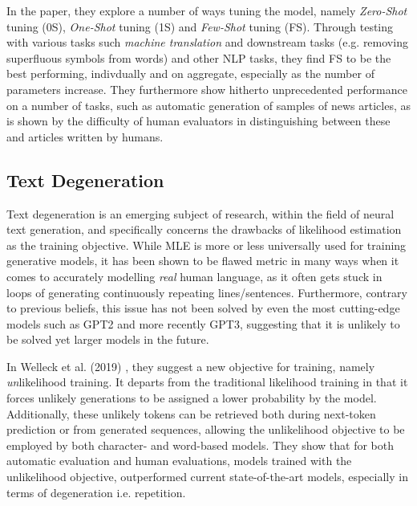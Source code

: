 In the paper, they explore a number of ways tuning the model, namely \textit{Zero-Shot} tuning (0S), \textit{One-Shot} tuning (1S) and \textit{Few-Shot} tuning (FS). Through testing with various tasks such \textit{machine translation} and downstream tasks (e.g. removing superfluous symbols from words) and other NLP tasks, they find FS to be the best performing, indivdually and on aggregate, especially as the number of parameters increase. They furthermore show hitherto unprecedented performance on a number of tasks, such as automatic generation of samples of news articles, as is shown by the difficulty of human evaluators in distinguishing between these and articles written by humans.

\subsection{Text Degeneration}
\label{sec:text-degeneration}
Text degeneration is an emerging subject of research, within the field of neural text generation, and specifically concerns the drawbacks of likelihood estimation as the training objective. While MLE is more or less universally used for training generative models, it has been shown to be flawed metric in many ways when it comes to accurately modelling \textit{real} human language, as it often gets stuck in loops of generating continuously repeating lines/sentences. Furthermore, contrary to previous beliefs, this issue has not been solved by even the most cutting-edge models such as GPT2 and more recently GPT3, suggesting that it is unlikely to be solved yet larger models in the future.

In Welleck et al. (2019) \cite{Welleck2019Unlikelyhood}, they suggest a new objective for training, namely \textit{un}likelihood training. It departs from the traditional likelihood training in that it forces unlikely generations to be assigned a lower probability by the model. Additionally, these unlikely tokens can be retrieved both during next-token prediction or from generated sequences, allowing the unlikelihood objective to be employed by both character- and word-based models. They show that for both automatic evaluation and human evaluations, models trained with the unlikelihood objective, outperformed current state-of-the-art models, especially in terms of degeneration i.e. repetition.

